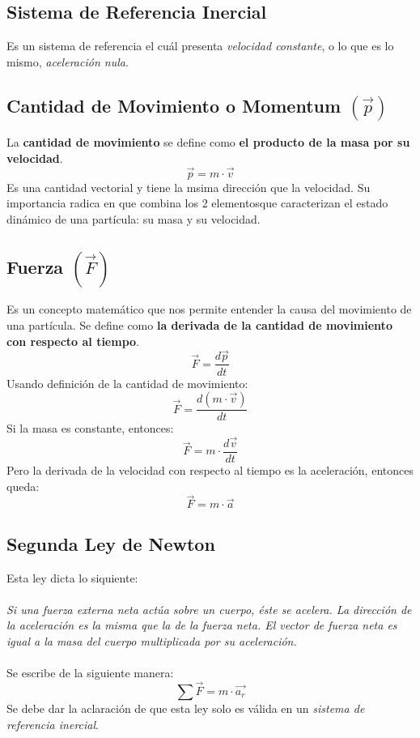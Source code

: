 \documentclass[../main.tex]{subfiles}
\begin{document}
\subsection{Sistema de Referencia Inercial}
Es un sistema de referencia el cuál presenta \textit{velocidad constante}, o lo que es lo mismo, \textit{aceleración nula}.
\subsection{Cantidad de Movimiento o Momentum \( ( \vec{p} ) \)}
La \textbf{cantidad de movimiento} se define como \textbf{el producto de la masa por su velocidad}.\cite{finn}
\[ \vec{p} = m \cdot \vec{v} \]
Es una cantidad vectorial y tiene la msima dirección que la velocidad. Su importancia radica en que combina los 2 elementosque caracterizan el estado dinámico de una partícula: su masa y su velocidad.\cite{finn}
\subsection{Fuerza  \( ( \vec{F} ) \)}
Es un concepto matemático que nos permite entender la causa del movimiento de una partícula. Se define como \textbf{la derivada de la cantidad de movimiento con respecto al tiempo}.\cite{finn}
\[ \vec{F} = \frac{d \vec{p}}{dt} \]
Usando definición de la cantidad de movimiento:
\[ \vec{F} = \frac{d  (m \cdot \vec{v}) }{dt} \]
Si la masa es constante, entonces:
\[ \vec{F} = m \cdot \frac{d \vec{v} }{dt} \]
Pero la derivada de la velocidad con respecto al tiempo es la aceleración, entonces queda:
\[ \vec{F}  = m \cdot \vec{a} \]

\subsection{Segunda Ley de Newton}
Esta ley dicta lo siquiente: \\ \\
\textit{Si una fuerza externa neta actúa sobre un cuerpo, éste se acelera. La dirección de la aceleración es la misma 
que la de la fuerza neta. El vector de fuerza neta es igual a la masa del cuerpo 
multiplicada por su aceleración.} \cite{sears} \\ \\
Se escribe de la siguiente manera:
\[ \sum \vec{F}  = m \cdot \vec{a_r} \]
Se debe dar la aclaración de que esta ley solo es válida en un \textit{sistema de referencia inercial}.
\end{document}
